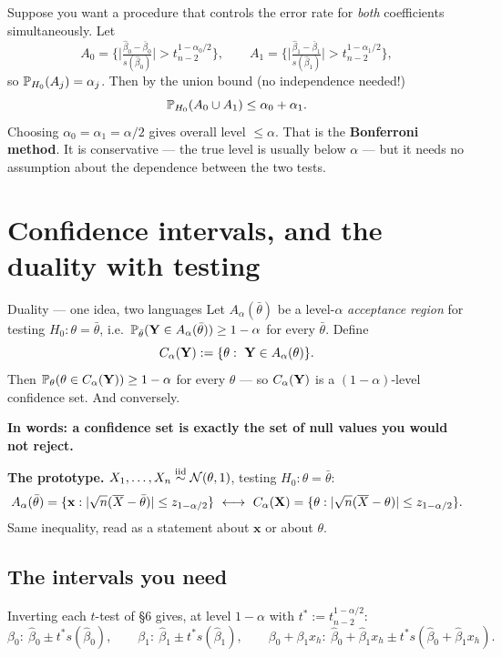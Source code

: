 \documentclass[11pt]{article}
\begin{document}
Suppose you want a procedure that controls the error rate for \emph{both} coefficients
simultaneously. Let
\[
  A_0=\Big\{\Big|\tfrac{\hat\beta_0-\bar\beta_0}{s(\hat\beta_0)}\Big|>t^{1-\alpha_0/2}_{n-2}\Big\},
  \qquad
  A_1=\Big\{\Big|\tfrac{\hat\beta_1-\bar\beta_1}{s(\hat\beta_1)}\Big|>t^{1-\alpha_1/2}_{n-2}\Big\},
\]
so $\mathbb{P}_{H_0}(A_j)=\alpha_j$. Then by the union bound (no independence needed!)
\[
  \mathbb{P}_{H_0}(A_0\cup A_1)\le \alpha_0+\alpha_1 .
\]
Choosing $\alpha_0=\alpha_1=\alpha/2$ gives overall level $\le\alpha$. That is the
\textbf{Bonferroni method}. It is conservative --- the true level is usually below $\alpha$
--- but it needs no assumption about the dependence between the two tests.

\section{Confidence intervals, and the duality with testing}

\begin{idea}{Duality --- one idea, two languages}
Let $A_\alpha(\bar\theta)$ be a level-$\alpha$ \emph{acceptance region} for testing
$H_0:\theta=\bar\theta$, i.e.\ $\mathbb{P}_{\bar\theta}(\mathbf{Y}\in A_\alpha(\bar\theta))\ge 1-\alpha$
for every $\bar\theta$. Define
\[
  C_\alpha(\mathbf{Y}) := \{\theta:\ \mathbf{Y}\in A_\alpha(\theta)\} .
\]
Then $\mathbb{P}_\theta(\theta\in C_\alpha(\mathbf{Y}))\ge 1-\alpha$ for every $\theta$ --- so
$C_\alpha(\mathbf{Y})$ is a $(1-\alpha)$-level confidence set. And conversely.

\textbf{In words: a confidence set is exactly the set of null values you would not reject.}
\end{idea}

\textbf{The prototype.} $X_1,\dots,X_n\overset{\text{iid}}{\sim}\mathcal{N}(\theta,1)$, testing $H_0:\theta=\bar\theta$:
\[
  A_\alpha(\bar\theta)=\{\mathbf{x}: |\sqrt n(\overline{X}-\bar\theta)|\le z_{1-\alpha/2}\}
  \ \longleftrightarrow\
  C_\alpha(\mathbf{X})=\{\theta: |\sqrt n(\overline{X}-\theta)|\le z_{1-\alpha/2}\}.
\]
Same inequality, read as a statement about $\mathbf{x}$ or about $\theta$.

\subsection{The intervals you need}

Inverting each $t$-test of \S6 gives, at level $1-\alpha$ with $t^\ast := t^{1-\alpha/2}_{n-2}$:
\[
  \beta_0:\ \hat\beta_0 \pm t^\ast s(\hat\beta_0),\qquad
  \beta_1:\ \hat\beta_1 \pm t^\ast s(\hat\beta_1),\qquad
  \beta_0+\beta_1x_h:\ \hat\beta_0+\hat\beta_1x_h \pm t^\ast s(\hat\beta_0+\hat\beta_1x_h).
\]
\end{document}
